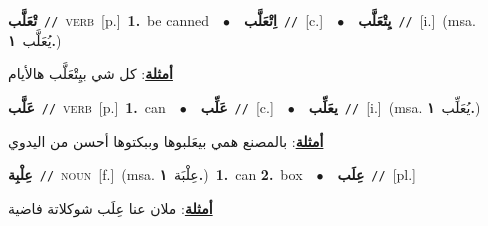 \documentclass[10pt,a4paper,twoside]{article} %
\begin{document}
\begin{multicols}{2}
{\setlength\topsep{0pt}\textbf{\foreignlanguage{arabic}{تْعَلَّب}}\ {\color{gray}\texttt{//}\color{black}}\ \textsc{verb}\ [p.]\ \textbf{1.}~be canned\ \ $\bullet$\ \ \setlength\topsep{0pt}\textbf{\foreignlanguage{arabic}{اِتْعَلَّب}}\ {\color{gray}\texttt{//}\color{black}}\ [c.]\ \ $\bullet$\ \ \setlength\topsep{0pt}\textbf{\foreignlanguage{arabic}{يِتْعَلَّب}}\ {\color{gray}\texttt{//}\color{black}}\ [i.]\ \color{gray}(msa. \foreignlanguage{arabic}{يُعَلَّب}~\foreignlanguage{arabic}{\textbf{١.}})\color{black}\  \begin{flushright}\color{gray}\foreignlanguage{arabic}{\textbf{\underline{\foreignlanguage{arabic}{أمثلة}}}: كل شي بيِتْعَلَّب هالأيام}\end{flushright}\color{black}} \vspace{2mm}

{\setlength\topsep{0pt}\textbf{\foreignlanguage{arabic}{عَلَّب}}\ {\color{gray}\texttt{//}\color{black}}\ \textsc{verb}\ [p.]\ \textbf{1.}~can\ \ $\bullet$\ \ \setlength\topsep{0pt}\textbf{\foreignlanguage{arabic}{عَلِّب}}\ {\color{gray}\texttt{//}\color{black}}\ [c.]\ \ $\bullet$\ \ \setlength\topsep{0pt}\textbf{\foreignlanguage{arabic}{يعَلِّب}}\ {\color{gray}\texttt{//}\color{black}}\ [i.]\ \color{gray}(msa. \foreignlanguage{arabic}{يُعَلِّب}~\foreignlanguage{arabic}{\textbf{١.}})\color{black}\  \begin{flushright}\color{gray}\foreignlanguage{arabic}{\textbf{\underline{\foreignlanguage{arabic}{أمثلة}}}: بالمصنع همي بيعَلبوها وببكتوها أحسن من اليدوي}\end{flushright}\color{black}} \vspace{2mm}

{\setlength\topsep{0pt}\textbf{\foreignlanguage{arabic}{عِلْبِة}}\ {\color{gray}\texttt{//}\color{black}}\ \textsc{noun}\ [f.]\ \color{gray}(msa. \foreignlanguage{arabic}{عِلْبَة}~\foreignlanguage{arabic}{\textbf{١.}})\color{black}\ \textbf{1.}~can  \textbf{2.}~box\ \ $\bullet$\ \ \setlength\topsep{0pt}\textbf{\foreignlanguage{arabic}{عِلَب}}\ {\color{gray}\texttt{//}\color{black}}\ [pl.]\  \begin{flushright}\color{gray}\foreignlanguage{arabic}{\textbf{\underline{\foreignlanguage{arabic}{أمثلة}}}: ملان عنا عِلَب شوكلاتة فاضية}\end{flushright}\color{black}} \vspace{2mm}


\end{multicols}
\end{document}
